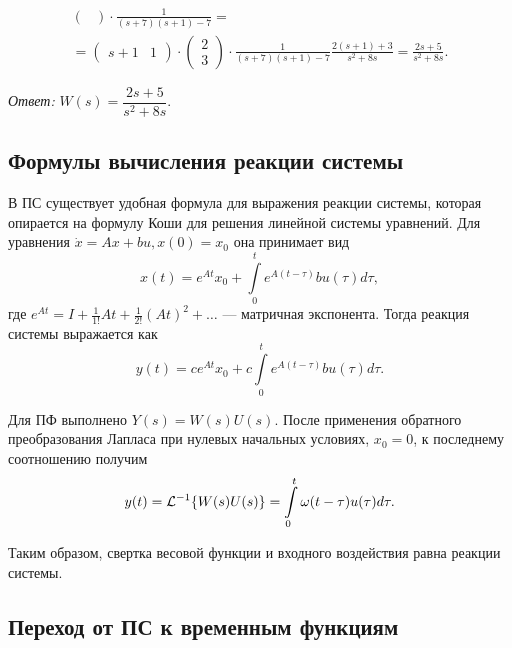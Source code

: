 \documentclass[../../TAU.tex]{subfiles}
\begin{document}
{\begin{multline*}
\begin{pmatrix}
            \end{pmatrix}
            \cdot
            \frac{1}{(s+7)(s+1)-7}
            =\\=
            \begin{pmatrix}
                s+1 & 1               
            \end{pmatrix}
            \cdot
            \begin{pmatrix}
                2 \\ 3              
            \end{pmatrix}
            \cdot
            \frac{1}{(s+7)(s+1)-7}
            \frac{2(s+1)+3}{s^2+8s}=
            \frac{2s+5}{s^2+8s}.
        \end{multline*}
            
        \textit{Ответ:} ${W(s)=\dfrac{2s+5}{s^2+8s}.}$
    }

\subsection{Формулы вычисления реакции системы}

    В ПС существует удобная формула для выражения реакции системы, которая опирается на формулу Коши для решения линейной системы уравнений. Для уравнения 
    ${\dot x = Ax + bu, x(0) = x_0}$ 
    она принимает вид
    $$
        x(t) = e^{At}x_0 + \int\limits_{0}^{t} e^{A(t-\tau)}bu(\tau)d\tau,
    $$
    где 
    ${e^{At} = I+\frac{1}{1!}At + \frac{1}{2!}(At)^{2} + \ldots}$ --- 
    матричная экспонента.
    Тогда реакция системы выражается как
    \begin{equation}\label{REACT}
        y(t) = ce^{At}x_0 + c\int\limits_{0}^{t} e^{A(t-\tau)}bu(\tau)d\tau.
    \end{equation}

    Для ПФ выполнено 
    ${Y(s) = W(s)U(s)}$. 
    После применения обратного преобразования Лапласа при нулевых начальных условиях, ${x_0=0}$, к последнему соотношению получим
    $$
        y(t) = \mathcal{L}^{-1}\{W(s)U(s)\} = \int\limits_{0}^t\omega(t-\tau)u(\tau)d\tau.
    $$

    Таким образом, свертка весовой функции и входного воздействия равна реакции системы.

\subsection{Переход от ПС к временным функциям}

\end{document}
